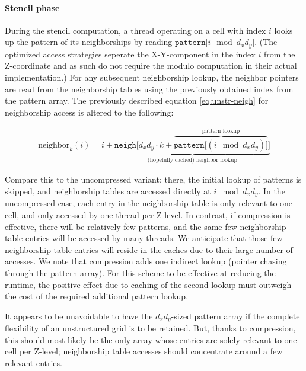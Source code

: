 \paragraph{Stencil phase}

During the stencil computation, a thread operating on a cell with index $i$ looks up the pattern of its neighborships by reading $\mathtt{pattern[}i \mod d_xd_y\mathtt{]}$. (The optimized access strategies seperate the X-Y-component in the index $i$ from the Z-coordinate and as such do not require the modulo computation in their actual implementation.) For any subsequent neighborship lookup, the neighbor pointers are read from the neighborship tables using the previously obtained index from the pattern array. The previously described equation \ref{eq:unstr-neigh} for neighborship access is altered to the following:

\begin{gather}
    \text{neighbor}_k(i) = i + \underbrace{\mathtt{neigh[}d_xd_y\cdot k + \overbrace{\mathtt{pattern[}(i \mod d_xd_y)\mathtt{]}}^\text{pattern lookup}\mathtt{]}}_\text{(hopefully cached) neighbor lookup} \label{eq:unstr-neigh-comp}
\end{gather}

Compare this to the uncompressed variant: there, the initial lookup of patterns is skipped, and neighborship tables are accessed directly at $i\mod d_xd_y$. In the uncompressed case, each entry in the neighborship table is only relevant to one cell, and only accessed by one thread per Z-level. In contrast, if compression is effective, there will be relatively few patterns, and the same few neighborship table entries will be accessed by many threads. We anticipate that those few neighborship table entries will reside in the caches due to their large number of accesses. We note that compression adds one indirect lookup (pointer chasing through the pattern array). For this scheme to be effective at reducing the runtime, the positive effect due to caching of the second lookup must outweigh the cost of the required additional pattern lookup.

It appears to be unavoidable to have the $d_xd_y$-sized pattern array if the complete flexibility of an unstructured grid is to be retained. But, thanks to compression, this should most likely be the only array whose entries are solely relevant to one cell per Z-level; neighborship table accesses should concentrate around a few relevant entries.

